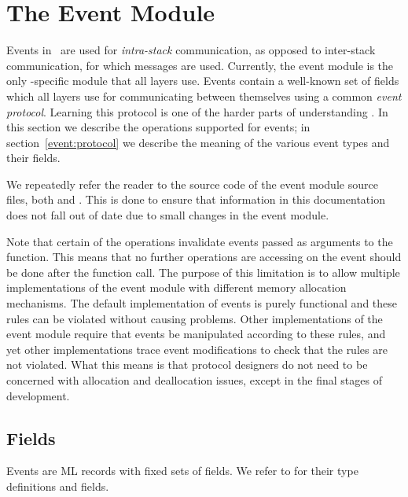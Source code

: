 %
%
%
\section{The Event Module}
\label{event:module}

Events in \ensemble\ are used for \emph{intra-stack} communication, as opposed
to inter-stack communication, for which messages are used.  Currently, the
event module is the only \ensemble-specific module that all layers use.
Events contain a well-known set of fields which all layers use for
communicating between themselves using a common \emph{event protocol}.
Learning this protocol is one of the harder parts of understanding \ensemble.
In this section we describe the operations supported for events; in
section~\ref{event:protocol} we describe the meaning of the various event
types and their fields.

We repeatedly refer the reader to the source code of the event module source
files, both  and .  This is done to
ensure that information in this documentation does not fall out of date due to
small changes in the event module.

Note that certain of the operations invalidate events passed as arguments to
the function.  This means that no further operations are accessing on the event
should be done after the function call.  The purpose of this limitation is to
allow multiple implementations of the event module with different memory
allocation mechanisms.  The default implementation of events is purely
functional and these rules can be violated without causing problems.  Other
implementations of the event module require that events be manipulated
according to these rules, and yet other implementations trace event
modifications to check that the rules are not violated.  What this means is
that protocol designers do not need to be concerned with allocation and
deallocation issues, except in the final stages of development.

\subsection{Fields}
Events are ML records with fixed sets of fields.  We refer to
 for their type definitions and fields.

